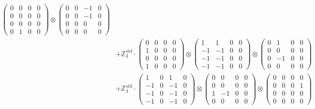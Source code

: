 \documentclass{article}
\begin{document}
{\begin{align}
            \begin{pmatrix} 0 & 0 & 0 & 0 \\ 0 & 0 & 0 & 0 \\ 0 & 0 & 0 & 0 \\ 0 & 1 & 0 & 0 \end{pmatrix} \otimes 
            \begin{pmatrix} 0 & 0 & -1 & 0 \\ 0 & 0 & -1 & 0 \\ 0 & 0 & 0 & 0 \\ 0 & 0 & 0 & 0 \end{pmatrix} \\ 
        &+ \label{Rs16-Rc11-Solution-32-c20} \mathbb{Z}_3^{std} \cdot 
            \begin{pmatrix} 0 & 0 & 0 & 0 \\ 1 & 0 & 0 & 0 \\ 0 & 0 & 0 & 0 \\ 1 & 0 & 0 & 0 \end{pmatrix} \otimes 
            \begin{pmatrix} 1 & 1 & 0 & 0 \\ -1 & -1 & 0 & 0 \\ -1 & -1 & 0 & 0 \\ -1 & -1 & 0 & 0 \end{pmatrix} \otimes 
            \begin{pmatrix} 0 & 1 & 0 & 0 \\ 0 & 0 & 0 & 0 \\ 0 & -1 & 0 & 0 \\ 0 & 0 & 0 & 0 \end{pmatrix} \\ 
        &+ \label{Rs16-Rc11-Solution-32-c21} \mathbb{Z}_3^{std} \cdot 
            \begin{pmatrix} 1 & 0 & 1 & 0 \\ -1 & 0 & -1 & 0 \\ -1 & 0 & -1 & 0 \\ -1 & 0 & -1 & 0 \end{pmatrix} \otimes 
            \begin{pmatrix} 0 & 0 & 0 & 0 \\ 0 & 0 & 0 & 0 \\ 1 & -1 & 0 & 0 \\ 0 & 0 & 0 & 0 \end{pmatrix} \otimes 
            \begin{pmatrix} 0 & 0 & 0 & 0 \\ 0 & 0 & 0 & 1 \\ 0 & 0 & 0 & 0 \\ 0 & 0 & 0 & 0 \end{pmatrix} \\ 

\end{align}}
\end{document}

